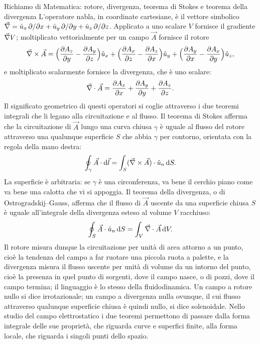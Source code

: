 \documentclass[11pt,a4paper]{article}
\begin{document}
\begin{riquadro}[label=ric:gauss:stokesdiv]{Richiamo di Matematica: rotore, divergenza, teorema di Stokes e teorema della divergenza}
L'operatore nabla, in coordinate cartesiane, è il vettore simbolico $\vec{\nabla}=\hat{u}_x\,\partial/\partial x+\hat{u}_y\,\partial/\partial y+\hat{u}_z\,\partial/\partial z$. Applicato a uno scalare $V$ fornisce il gradiente $\vec{\nabla} V$; moltiplicato vettorialmente per un campo $\vec{A}$ fornisce il rotore
\[
\vec{\nabla}\times\vec{A}=\Bigl(\frac{\partial A_z}{\partial y}-\frac{\partial A_y}{\partial z}\Bigr)\hat{u}_x+\Bigl(\frac{\partial A_x}{\partial z}-\frac{\partial A_z}{\partial x}\Bigr)\hat{u}_y+\Bigl(\frac{\partial A_y}{\partial x}-\frac{\partial A_x}{\partial y}\Bigr)\hat{u}_z ,
\]
e moltiplicato scalarmente fornisce la divergenza, che è uno scalare:
\[
\vec{\nabla}\cdot\vec{A}=\frac{\partial A_x}{\partial x}+\frac{\partial A_y}{\partial y}+\frac{\partial A_z}{\partial z}.
\]
Il significato geometrico di questi operatori si coglie attraverso i due teoremi integrali che li legano alla circuitazione e al flusso. Il teorema di Stokes afferma che la circuitazione di $\vec{A}$ lungo una curva chiusa $\gamma$ è uguale al flusso del rotore attraverso una qualunque superficie $S$ che abbia $\gamma$ per contorno, orientata con la regola della mano destra:
\[
\oint_\gamma\vec{A}\cdot\mathrm{d}\vec{l}=\int_S(\vec{\nabla}\times\vec{A})\cdot\hat{u}_n\,\mathrm{d} S .
\]
La superficie è arbitraria: se $\gamma$ è una circonferenza, va bene il cerchio piano come va bene una calotta che vi si appoggia. Il teorema della divergenza, o di Ostrogradskij--Gauss, afferma che il flusso di $\vec{A}$ uscente da una superficie chiusa $S$ è uguale all'integrale della divergenza esteso al volume $V$ racchiuso:
\[
\oint_S\vec{A}\cdot\hat{u}_n\,\mathrm{d} S=\int_V\vec{\nabla}\cdot\vec{A}\,\mathrm{d} V .
\]
Il rotore misura dunque la circuitazione per unità di area attorno a un punto, cioè la tendenza del campo a far ruotare una piccola ruota a palette, e la divergenza misura il flusso uscente per unità di volume da un intorno del punto, cioè la presenza in quel punto di sorgenti, dove il campo nasce, o di pozzi, dove il campo termina; il linguaggio è lo stesso della fluidodinamica. Un campo a rotore nullo si dice irrotazionale; un campo a divergenza nulla ovunque, il cui flusso attraverso qualunque superficie chiusa è quindi nullo, si dice solenoidale. Nello studio del campo elettrostatico i due teoremi permettono di passare dalla forma integrale delle sue proprietà, che riguarda curve e superfici finite, alla forma locale, che riguarda i singoli punti dello spazio.
\end{riquadro}
\end{document}
